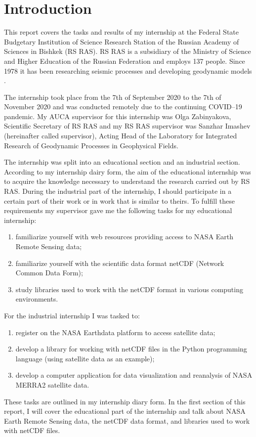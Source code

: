 \documentclass[../00_main.tex]{subfiles}
\begin{document}
\section{Introduction}

This report covers the tasks and results of my internship at the Federal State
Budgetary Institution of Science Research Station of the Russian Academy of 
Sciences in Bishkek (RS RAS). RS RAS is a subsidiary of the Ministry of Science 
and Higher Education of the Russian Federation and employs 137 people. Since 
1978 it has been researching seismic processes and developing geodynamic
models \cite{rsras-website}.\newline

The internship took place from the 7th of September 2020 to the 7th of November 
2020 and was conducted remotely due to the continuing COVID--19 pandemic. My 
AUCA supervisor for this internship was Olga Zabinyakova, Scientific Secretary 
of RS RAS and my RS RAS supervisor was Sanzhar Imashev (hereinafter called 
supervisor), Acting Head of the Laboratory for Integrated Research of 
Geodynamic Processes in Geophysical Fields.\newline

The internship was split into an educational section and an industrial section. 
According to my internship dairy form, the aim of the educational internship
was to acquire the knowledge necessary to understand the research carried out 
by RS RAS. During the industrial part of the internship, I should participate 
in a certain part of their work or in work that is similar to theirs. To 
fulfill these requirements my supervisor gave me the following tasks for my 
educational internship:
\begin{enumerate}
    \item familiarize yourself with web resources providing access to NASA 
        Earth Remote Sensing data;
    \item familiarize yourself with the scientific data format netCDF (Network
        Common Data Form);
    \item study libraries used to work with the netCDF format in various 
        computing environments.
\end{enumerate}
\noindent
For the industrial internship I was tasked to:
\begin{enumerate}
    \item register on the NASA Earthdata platform to access satellite data;
    \item develop a library for working with netCDF files in the Python
        programming language (using satellite data as an example);
    \item develop a computer application for data visualization and reanalysis 
        of NASA MERRA2 satellite data.
\end{enumerate}
These tasks are outlined in my internship diary form. In the first section of
this report, I will cover the educational part of the internship and talk about 
NASA Earth Remote Sensing data, the netCDF data format, and libraries used to 
work with netCDF files.\newline
\end{document}
